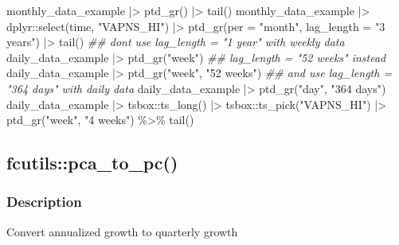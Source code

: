\documentclass[
  letterpaper,
  DIV=11,
  numbers=noendperiod]{scrreport}
\newenvironment{Shaded}{\begin{snugshade}}{\end{snugshade}}
\newcommand{\AttributeTok}[1]{\textcolor[rgb]{0.40,0.45,0.13}{#1}}
\newcommand{\DocumentationTok}[1]{\textcolor[rgb]{0.37,0.37,0.37}{\textit{#1}}}
\newcommand{\FunctionTok}[1]{\textcolor[rgb]{0.28,0.35,0.67}{#1}}
\newcommand{\NormalTok}[1]{\textcolor[rgb]{0.00,0.23,0.31}{#1}}
\newcommand{\SpecialCharTok}[1]{\textcolor[rgb]{0.37,0.37,0.37}{#1}}
\newcommand{\StringTok}[1]{\textcolor[rgb]{0.13,0.47,0.30}{#1}}
\begin{document}
\begin{Shaded}
\begin{Highlighting}[]
\NormalTok{monthly\_data\_example }\SpecialCharTok{|\textgreater{}}
  \FunctionTok{ptd\_gr}\NormalTok{() }\SpecialCharTok{|\textgreater{}}
  \FunctionTok{tail}\NormalTok{()}
\NormalTok{monthly\_data\_example }\SpecialCharTok{|\textgreater{}}
\NormalTok{  dplyr}\SpecialCharTok{::}\FunctionTok{select}\NormalTok{(time, }\StringTok{"VAPNS\_HI"}\NormalTok{) }\SpecialCharTok{|\textgreater{}}
  \FunctionTok{ptd\_gr}\NormalTok{(}\AttributeTok{per =} \StringTok{"month"}\NormalTok{, }\AttributeTok{lag\_length =} \StringTok{"3 years"}\NormalTok{) }\SpecialCharTok{|\textgreater{}}
  \FunctionTok{tail}\NormalTok{()}
\DocumentationTok{\#\# don\textquotesingle{}t use lag\_length = "1 year" with weekly data}
\NormalTok{daily\_data\_example }\SpecialCharTok{|\textgreater{}}
  \FunctionTok{ptd\_gr}\NormalTok{(}\StringTok{"week"}\NormalTok{)}
\DocumentationTok{\#\# lag\_length = "52 weeks" instead}
\NormalTok{daily\_data\_example }\SpecialCharTok{|\textgreater{}}
  \FunctionTok{ptd\_gr}\NormalTok{(}\StringTok{"week"}\NormalTok{, }\StringTok{"52 weeks"}\NormalTok{)}
\DocumentationTok{\#\# and use lag\_length = "364 days" with daily data}
\NormalTok{daily\_data\_example }\SpecialCharTok{|\textgreater{}}
  \FunctionTok{ptd\_gr}\NormalTok{(}\StringTok{"day"}\NormalTok{, }\StringTok{"364 days"}\NormalTok{)}
\NormalTok{daily\_data\_example }\SpecialCharTok{|\textgreater{}}
\NormalTok{  tsbox}\SpecialCharTok{::}\FunctionTok{ts\_long}\NormalTok{() }\SpecialCharTok{|\textgreater{}}
\NormalTok{  tsbox}\SpecialCharTok{::}\FunctionTok{ts\_pick}\NormalTok{(}\StringTok{"VAPNS\_HI"}\NormalTok{) }\SpecialCharTok{|\textgreater{}}
  \FunctionTok{ptd\_gr}\NormalTok{(}\StringTok{"week"}\NormalTok{, }\StringTok{"4 weeks"}\NormalTok{) }\SpecialCharTok{\%\textgreater{}\%}
  \FunctionTok{tail}\NormalTok{()}
\end{Highlighting}
\end{Shaded}

\subsection{fcutils::pca\_to\_pc()}\label{fcutilspca_to_pc}

\subsubsection{Description}\label{description-45}

Convert annualized growth to quarterly growth
\end{document}
